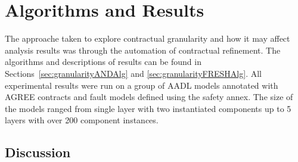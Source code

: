 \section{Algorithms and Results}
The approache taken to explore contractual granularity and how it may affect analysis results was through the automation of contractual refinement. The algorithms and descriptions of results can be found in Sections~\ref{sec:granularityANDAlg} and \ref{sec:granularityFRESHAlg}. All experimental results were run on a group of  AADL models annotated with AGREE contracts and fault models defined using the safety annex. The size of the models ranged from single layer with two instantiated components up to 5 layers with over 200 component instances. 



%
%


\subsection{Discussion}